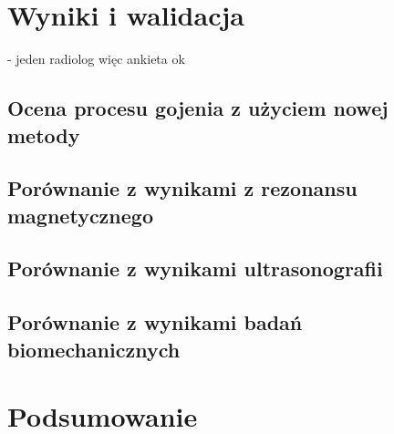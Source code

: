 \chapter{Wyniki i walidacja}
- jeden radiolog więc ankieta ok

\section{Ocena procesu gojenia z użyciem nowej metody}
\section{Porównanie z wynikami z rezonansu magnetycznego}
\section{Porównanie z wynikami ultrasonografii}
\section{Porównanie z wynikami badań biomechanicznych}


\chapter{Podsumowanie}